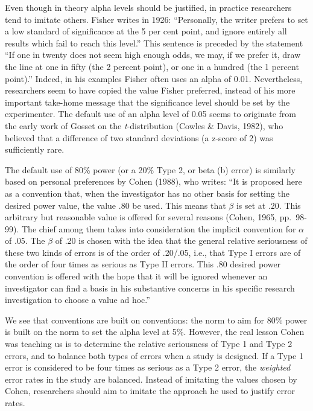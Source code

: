 \documentclass[
  english,
  ,jou,floatsintext]{apa6}
\begin{document}
Even though in theory alpha levels should be justified, in practice researchers tend to imitate others. Fisher writes in 1926: ``Personally, the writer prefers to set a low standard of significance at the 5 per cent point, and ignore entirely all results which fail to reach this level.'' This sentence is preceded by the statement ``If one in twenty does not seem high enough odds, we may, if we prefer it, draw the line at one in fifty (the 2 percent point), or one in a hundred (the 1 percent point).'' Indeed, in his examples Fisher often uses an alpha of 0.01. Nevertheless, researchers seem to have copied the value Fisher preferred, instead of his more important take-home message that the significance level should be set by the experimenter. The default use of an alpha level of 0.05 seems to originate from the early work of Gosset on the \emph{t}-distribution (Cowles \& Davis, 1982), who believed that a difference of two standard deviations (a z-score of 2) was sufficiently rare.

The default use of 80\% power (or a 20\% Type 2, or beta (b) error) is similarly based on personal preferences by Cohen (1988), who writes: ``It is proposed here as a convention that, when the investigator has no other basis for setting the desired power value, the value .80 be used. This means that \(\beta\) is set at .20. This arbitrary but reasonable value is offered for several reasons (Cohen, 1965, pp.~98-99). The chief among them takes into consideration the implicit convention for \(\alpha\) of .05. The \(\beta\) of .20 is chosen with the idea that the general relative seriousness of these two kinds of errors is of the order of .20/.05, i.e., that Type I errors are of the order of four times as serious as Type II errors. This .80 desired power convention is offered with the hope that it will be ignored whenever an investigator can find a basis in his substantive concerns in his specific research investigation to choose a value ad hoc.''

We see that conventions are built on conventions: the norm to aim for 80\% power is built on the norm to set the alpha level at 5\%. However, the real lesson Cohen was teaching us is to determine the relative seriousness of Type 1 and Type 2 errors, and to balance both types of errors when a study is designed. If a Type 1 error is considered to be four times as serious as a Type 2 error, the \emph{weighted} error rates in the study are balanced. Instead of imitating the values chosen by Cohen, researchers should aim to imitate the approach he used to justify error rates.
\end{document}
